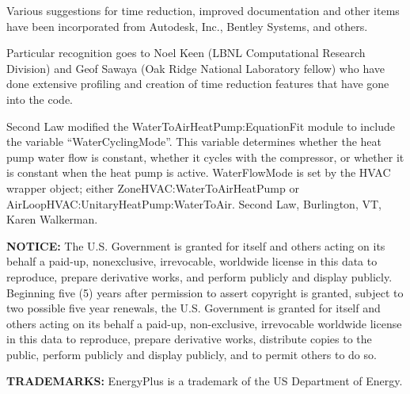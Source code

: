 Various suggestions for time reduction, improved documentation and other items have been incorporated from Autodesk, Inc., Bentley Systems, and others.

Particular recognition goes to Noel Keen (LBNL Computational Research Division) and Geof Sawaya (Oak Ridge National Laboratory fellow) who have done extensive profiling and creation of time reduction features that have gone into the code.

Second Law modified the WaterToAirHeatPump:EquationFit module to include the variable ``WaterCyclingMode''. This variable determines whether the heat pump water flow is constant, whether it cycles with the compressor, or whether it is constant when the heat pump is active. WaterFlowMode is set by the HVAC wrapper object; either ZoneHVAC:WaterToAirHeatPump or AirLoopHVAC:UnitaryHeatPump:WaterToAir. Second Law, Burlington, VT, Karen Walkerman.

\textbf{NOTICE:} The U.S. Government is granted for itself and others acting on its behalf a paid-up, nonexclusive, irrevocable, worldwide license in this data to reproduce, prepare derivative works, and perform publicly and display publicly. Beginning five (5) years after permission to assert copyright is granted, subject to two possible five year renewals, the U.S. Government is granted for itself and others acting on its behalf a paid-up, non-exclusive, irrevocable worldwide license in this data to reproduce, prepare derivative works, distribute copies to the public, perform publicly and display publicly, and to permit others to do so.

\textbf{TRADEMARKS:} EnergyPlus is a trademark of the US Department of Energy.
